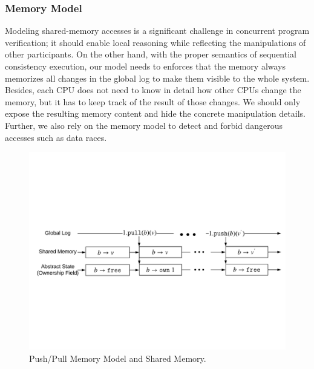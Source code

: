 \subsubsection{Memory Model}

Modeling shared-memory accesses is 
a significant challenge in concurrent program verification;
it should enable local reasoning while reflecting the manipulations of other participants.
On the other hand, 
with the proper semantics of sequential consistency execution,
our model needs to enforces that the memory always memorizes all changes in the global log to make them visible to the whole system.
Besides,   
each CPU does not need to know in detail how other CPUs 
change the memory, but it has to keep track of the result of those changes.
We should  only expose the resulting memory 
content and hide the concrete manipulation details.
Further, we also rely on the memory model
to detect and forbid dangerous accesses such as data races.


\begin{figure}
\includegraphics[width=\textwidth]{figs/ccal/pushpullsharedmemory}
\caption{Push/Pull Memory Model and Shared Memory.}
\label{fig:chapter:ccal:push-pull-memory-model-and-shared-memory}
\end{figure}

